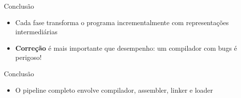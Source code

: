\begin{frame}{Conclusão}

    \begin{itemize}

        \item
        Cada fase transforma o programa incrementalmente com representações
        intermediárias
        \item
        \textbf{Correção} é mais importante que desempenho: um compilador com
        bugs é perigoso!
    \end{itemize}
\end{frame}

\begin{frame}{Conclusão}

    \begin{itemize}

        \item
        O pipeline completo envolve compilador, assembler, linker e loader
    \end{itemize}
\end{frame}
